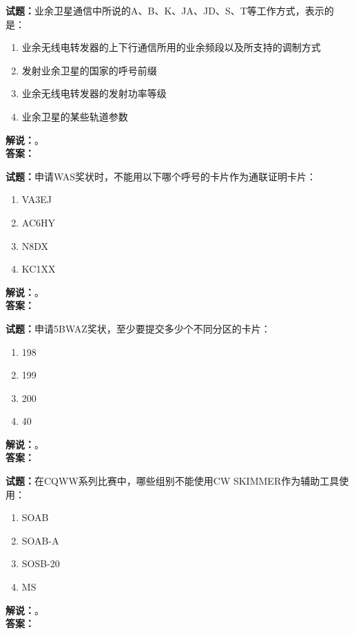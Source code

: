 \documentclass{ctexbook}
\begin{document}
\bigskip

\noindent\textbf{试题：}业余卫星通信中所说的A、B、K、JA、JD、S、T等工作方式，表示的是：
\begin{enumerate}[leftmargin=3em]
  \item 业余无线电转发器的上下行通信所用的业余频段以及所支持的调制方式
  \item 发射业余卫星的国家的呼号前缀
  \item 业余无线电转发器的发射功率等级
  \item 业余卫星的某些轨道参数
\end{enumerate}
\noindent\textbf{解说：}\textbf{}。\\\noindent\textbf{答案：}

\bigskip

\noindent\textbf{试题：}申请WAS奖状时，不能用以下哪个呼号的卡片作为通联证明卡片：
\begin{enumerate}[leftmargin=3em]
  \item VA3EJ
  \item AC6HY
  \item N8DX
  \item KC1XX
\end{enumerate}
\noindent\textbf{解说：}\textbf{}。\\\noindent\textbf{答案：}

\bigskip

\noindent\textbf{试题：}申请5BWAZ奖状，至少要提交多少个不同分区的卡片：
\begin{enumerate}[leftmargin=3em]
  \item 198
  \item 199
  \item 200
  \item 40
\end{enumerate}
\noindent\textbf{解说：}\textbf{}。\\\noindent\textbf{答案：}

\bigskip

\noindent\textbf{试题：}在CQWW系列比赛中，哪些组别不能使用CW SKIMMER作为辅助工具使用：
\begin{enumerate}[leftmargin=3em]
  \item SOAB
  \item SOAB-A
  \item SOSB-20
  \item MS
\end{enumerate}
\noindent\textbf{解说：}\textbf{}。\\\noindent\textbf{答案：}

\bigskip
\end{document}
